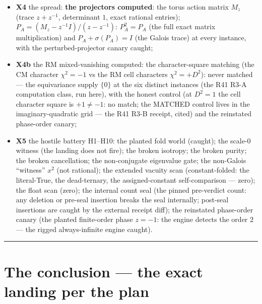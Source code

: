 \documentclass[11pt]{article}
\theoremstyle{definition}
\newcommand{\CERT}{\par\noindent\rule{\textwidth}{0.4pt}\par}
\begin{document}
\begin{itemize}
on the norm avatar $v=e_1\otimes f_1-e_2\otimes f_2$:
$(A\otimes B)v=+v$ exactly; the non-conjugate avatar: $-w$); the
phase-pair cancellation $z\cdot z^{-1}=1$ exactly (the $K$-arithmetic
at all eight RM instances, inside the per-instance loop --- the
negative-$s$ twins share $D^2$ and re-run the $D^2$-only computation:
the battery redundancy, disclosed; the other $D^2$-only layers run at
the six distinct values; the $s$-sensitive layers --- the X0 phase
gate and X4's $M_z$ --- genuinely need all eight);
\item \textbf{X4} the spread: \textbf{the projectors computed}: the
torus action matrix $M_z$ (trace $z+z^{-1}$, determinant $1$, exact
rational entries); $P_A=(M_z-z^{-1}I)/(z-z^{-1})$:
$P_A^2=P_A$ (the full exact matrix multiplication) and
$P_A+\sigma(P_A)=I$ (the Galois trace) at every instance, with the
perturbed-projector canary caught;
\item \textbf{X4b} the RM mixed-vanishing computed: the
character-square matching (the CM character $\chi^2=-1$ vs the RM cell
characters $\chi^2=+D^2$): never matched --- the equivariance supply
$\{0\}$ at the six distinct instances (the R41 R3-A computation
class, run here), with the honest control (at $D^2=1$ the cell
character square is $+1\neq-1$: no match; the MATCHED control lives in
the imaginary-quadratic grid --- the R41 R3-B receipt, cited) and the
reinstated phase-order canary;
\item \textbf{X5} the hostile battery H1--H10: the planted fold world
(caught); the scale-$0$ witness (the landing does not fire); the broken
isotropy; the broken purity; the broken cancellation; the
non-conjugate eigenvalue gate; the non-Galois ``witness'' $x^2$
(not rational); the extended vacuity scan (constant-folded: the
literal-True, the dead-ternary, the assigned-constant
self-comparison --- zero); the float scan (zero); the internal count seal (the pinned pre-verdict
count: any deletion or pre-seal insertion breaks the seal internally;
post-seal insertions are caught by the external receipt diff); the
reinstated phase-order canary (the planted finite-order phase $z=-1$:
the engine detects the order $2$ --- the rigged always-infinite engine
caught).
\end{itemize}
\CERT{}

\section{The conclusion --- the exact landing per the plan}
\end{document}
